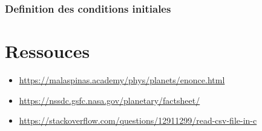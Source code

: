 \documentclass[a4paper,10pt]{article}
\begin{document}
    \subsubsection{Definition des conditions initiales}

    
    \section{Ressouces}\label{sec:ressouces}
    \begin{itemize}
        \item \href{https://malaspinas.academy/phys/planets/enonce.html}{https://malaspinas.academy/phys/planets/enonce.html}
        \item \href{https://nssdc.gsfc.nasa.gov/planetary/factsheet/}{https://nssdc.gsfc.nasa.gov/planetary/factsheet/}
        \item \href{https://stackoverflow.com/questions/12911299/read-csv-file-in-c}{https://stackoverflow.com/questions/12911299/read-csv-file-in-c}
    \end{itemize}
\end{document}
